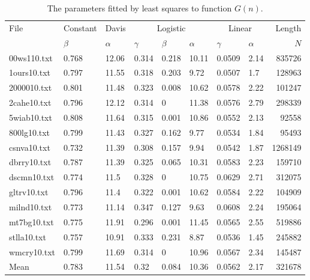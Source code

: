\documentclass[a4paper,12pt]{article}
\newcommand{\toprule}{\hline}
\newcommand{\midrule}{\hline}
\newcommand{\botrule}{\hline}
\begin{document}
\begin{table}[p]
  \caption{The parameters fitted by least squares to function
    $G(n)$.\label{tabPars}}
  \centering
  \medskip
  \footnotesize
  \begin{tabular}{|l|l|l|lll|ll|r|}
    \toprule
    File & Constant & Davis
    & \multicolumn{3}{c|}{Logistic}
    & \multicolumn{2}{c|}{Linear} & Length\\
    \cline{2-2}\cline{3-3}\cline{4-6}\cline{7-8}
    & $\beta$       & $\alpha$
    & $\gamma$      & $\beta$       & $\alpha$
    & $\gamma$      & $\alpha$      & $N$\\
\midrule
00ws110.txt     & 0.768 & 12.06 & 0.314 & 0.218 & 10.11 & 0.0509        & 2.14  & 835726\\
1ours10.txt     & 0.797 & 11.55 & 0.318 & 0.203 & 9.72  & 0.0507        & 1.7   & 128963\\
2000010.txt     & 0.801 & 11.48 & 0.323 & 0.008 & 10.62 & 0.0578        & 2.22  & 101247\\
2cahe10.txt     & 0.796 & 12.12 & 0.314 & 0     & 11.38 & 0.0576        & 2.79  & 298339\\
5wiab10.txt     & 0.808 & 11.64 & 0.315 & 0.001 & 10.86 & 0.0552        & 2.13  & 92558\\
800lg10.txt     & 0.799 & 11.43 & 0.327 & 0.162 & 9.77  & 0.0534        & 1.84  & 95493\\
csnva10.txt     & 0.732 & 11.39 & 0.308 & 0.157 & 9.94  & 0.0542        & 1.87  & 1268149\\
dbrry10.txt     & 0.787 & 11.39 & 0.325 & 0.065 & 10.31 & 0.0583        & 2.23  & 159710\\
dscmn10.txt     & 0.774 & 11.5  & 0.328 & 0     & 10.75 & 0.0629        & 2.71  & 312075\\
gltrv10.txt     & 0.796 & 11.4  & 0.322 & 0.001 & 10.62 & 0.0584        & 2.22  & 104909\\
milnd10.txt     & 0.773 & 11.14 & 0.347 & 0.127 & 9.63  & 0.0608        & 2.24  & 195064\\
mt7bg10.txt     & 0.775 & 11.91 & 0.296 & 0.001 & 11.45 & 0.0565        & 2.55  & 519886\\
stlla10.txt     & 0.757 & 10.91 & 0.333 & 0.231 & 8.87  & 0.0536        & 1.45  & 245882\\
wmcry10.txt     & 0.799 & 11.69 & 0.314 & 0     & 10.96 & 0.0567        & 2.34  & 145487\\
\midrule
Mean    & 0.783 & 11.54 & 0.32  & 0.084 & 10.36 & 0.0562        & 2.17  & 321678\\
\botrule
  \end{tabular}
\end{table}
\end{document}
